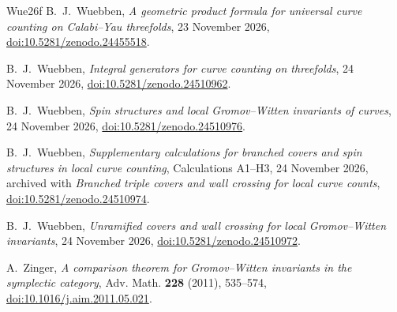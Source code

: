 \begin{thebibliography}{Wue26f}
 B.~J.~Wuebben,
\emph{A geometric product formula for universal curve counting on Calabi--Yau threefolds}, 23 November 2026,
\href{https://doi.org/10.5281/zenodo.24455518}{doi:10.5281/zenodo.24455518}.

 B.~J.~Wuebben,
\emph{Integral generators for curve counting on threefolds}, 24 November 2026,
\href{https://doi.org/10.5281/zenodo.24510962}{doi:10.5281/zenodo.24510962}.

 B.~J.~Wuebben,
\emph{Spin structures and local Gromov--Witten invariants of curves}, 24 November 2026,
\href{https://doi.org/10.5281/zenodo.24510976}{doi:10.5281/zenodo.24510976}.

 B.~J.~Wuebben,
\emph{Supplementary calculations for branched covers and spin structures in local curve counting}, Calculations A1--H3, 24 November 2026, archived with \emph{Branched triple covers and wall crossing for local curve counts},
\href{https://doi.org/10.5281/zenodo.24510974}{doi:10.5281/zenodo.24510974}.

 B.~J.~Wuebben,
\emph{Unramified covers and wall crossing for local Gromov--Witten invariants}, 24 November 2026,
\href{https://doi.org/10.5281/zenodo.24510972}{doi:10.5281/zenodo.24510972}.

 A.~Zinger,
\emph{A comparison theorem for Gromov--Witten invariants in the
symplectic category}, Adv. Math. \textbf{228} (2011), 535--574,
\href{https://doi.org/10.1016/j.aim.2011.05.021}{doi:10.1016/j.aim.2011.05.021}.
\end{thebibliography}
